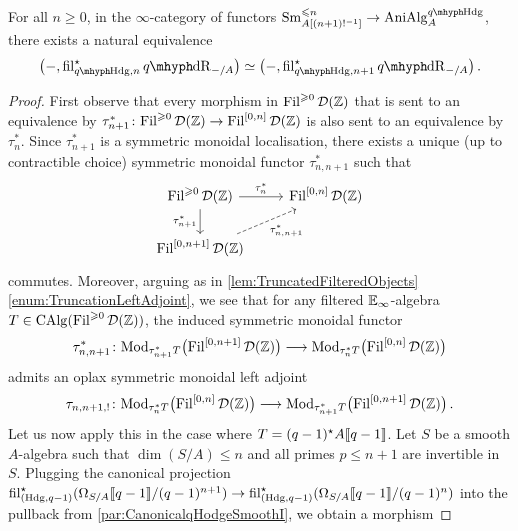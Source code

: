 \documentclass[DIV=12,numbers=enddot,leqno,bibliography=totoc]{scrartcl}
\begin{document}
	\begin{lem}\label{lem:CanonicalqHodgeSmoothFunctorial}
		For all $n\geqslant 0$, in the $\infty$-category of functors $\cat{Sm}_{A[(n+1)!^{-1}]}^{\leqslant n}\rightarrow \cat{AniAlg}_A^{\qHodge}$, there exists a natural equivalence
		\begin{equation*}
			\bigl(-,\fil_{\qHodge,n}^\star\qdeRham_{-/A}\bigr)\simeq \bigl(-,\fil_{\qHodge,n+1}^\star\qdeRham_{-/A}\bigr)\,.
		\end{equation*}
	\end{lem}
	\begin{proof}
		First observe that every morphism in $\operatorname{Fil}^{\geqslant 0}\mathcal{D}(\mathbb{Z})$ that is sent to an equivalence by $\tau_{n+1}^*\colon \Fil^{\geqslant 0}\Dd(\IZ)\rightarrow \Fil^{[0,n]}\Dd(\IZ)$ is also sent to an equivalence by $\tau_n^*$. Since $\tau_{n+1}^*$ is a symmetric monoidal localisation, there exists a unique (up to contractible choice) symmetric monoidal functor $\tau_{n,n+1}^*$ such that
		\begin{equation*}
			\begin{tikzcd}
				\Fil^{\geqslant 0}\Dd(\IZ)\dar["\tau_{n+1}^*"']\rar["\tau_n^*"] & \Fil^{[0,n]}\Dd(\IZ)\\
				\Fil^{[0,n+1]}\Dd(\IZ)\urar[dashed,"\tau_{n,n+1}^*"'] &
			\end{tikzcd}
		\end{equation*}
		commutes. Moreover, arguing as in \cref{lem:TruncatedFilteredObjects}\cref{enum:TruncationLeftAdjoint}, we see that for any filtered $\mathbb{E}_\infty$-algebra $T\in\operatorname{CAlg}(\operatorname{Fil}^{\geqslant 0}\mathcal{D}(\mathbb{Z}))$, the induced symmetric monoidal functor
		\begin{equation*}
			\tau_{n,n+1}^*\colon \Mod_{\tau_{n+1}^*T}\bigl(\Fil^{[0,n+1]}\Dd(\IZ)\bigr)\longrightarrow \Mod_{\tau_n^*T}\bigl(\Fil^{[0,n]}\Dd(\IZ)\bigr)
		\end{equation*}
		admits an oplax symmetric monoidal left adjoint
		\begin{equation*}
			\tau_{n,n+1,!}\colon  \Mod_{\tau_n^*T}\bigl(\Fil^{[0,n]}\Dd(\IZ)\bigr)\longrightarrow\Mod_{\tau_{n+1}^*T}\bigl(\Fil^{[0,n+1]}\Dd(\IZ)\bigr)\,.
		\end{equation*}
		Let us now apply this in the case where $T=(q-1)^\star A\llbracket q-1\rrbracket$. Let $S$ be a smooth $A$-algebra such that $\dim(S/A)\leqslant n$ and all primes $p\leqslant n+1$ are invertible in $S$. Plugging the canonical projection $\operatorname{fil}_{(\mathrm{Hdg},q-1)}^\star(\Omega_{S/A}\llbracket q-1\rrbracket/(q-1)^{n+1})\rightarrow \operatorname{fil}_{(\mathrm{Hdg},q-1)}^\star(\Omega_{S/A}\llbracket q-1\rrbracket/(q-1)^{n})$ into the pullback from \cref{par:CanonicalqHodgeSmoothI}, we obtain a morphism 

\end{proof}
\end{document}
